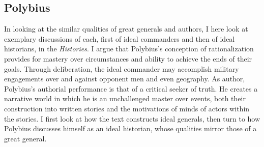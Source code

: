 \documentclass[12pt,letterpaper,oneside,final]{memoir}
\begin{document}
\subsection{Polybius}
\label{polyb-comm}
In looking at the similar  qualities of great generals and authors, I here look at exemplary discussions of each, first of ideal commanders and then of ideal historians, in the \emph{Histories}. I argue that Polybius's conception of rationalization provides for mastery over circumstances and ability to achieve the ends of their goals. Through deliberation, the ideal commander may accomplish military engagements over and against opponent men and even geography. As author, Polybius's authorial performance is that of a critical seeker of truth. He creates a narrative world in which he is an unchallenged master over events, both their construction into written stories and the motivations of minds of actors within the stories. I first look at how the text constructs ideal generals, then turn to how Polybius discusses himself as an ideal historian, whose qualities mirror those of a great general.
\end{document}
